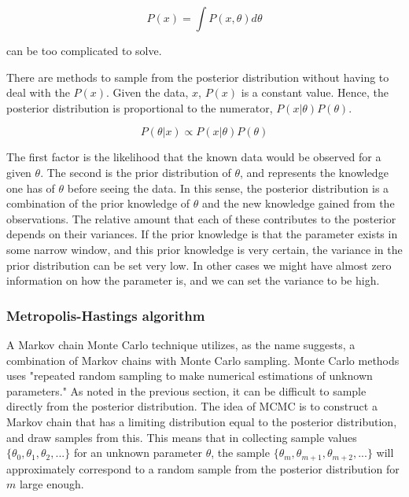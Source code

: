 \begin{equation}
    P(x) = \int P(x,\theta)d\theta
\end{equation}

can be too complicated to solve. 

There are methods to sample from the posterior distribution without having to deal with the $P(x)$. Given the data, $x$, $P(x)$ is a constant value. Hence, the posterior distribution is proportional to the numerator, $P(x|\theta)P(\theta)$. 

\begin{equation}
    P(\theta | x) \propto P(x|\theta)P(\theta)
\end{equation}

 The first factor is the likelihood that the known data would be observed for a given $\theta$. The second is the prior distribution of $\theta$, and represents the knowledge one has of $\theta$ before seeing the data. In this sense, the posterior distribution is a combination of the prior knowledge of $\theta$ and the new knowledge gained from the observations. The relative amount that each of these contributes to the posterior depends on their variances. If the prior knowledge is that the parameter exists in some narrow window, and this prior knowledge is very certain, the variance in the prior distribution can be set very low. In other cases we might have almost zero information on how the parameter is, and we can set the variance to be high. 

\subsubsection{Metropolis-Hastings algorithm}
\label{Metropolis}
A Markov chain Monte Carlo technique utilizes, as the name suggests, a combination of Markov chains with Monte Carlo sampling. Monte Carlo methods uses "repeated random sampling to make numerical estimations of unknown parameters."  
As noted in the previous section, it can be difficult to sample directly from the posterior distribution. The idea of MCMC is to construct a Markov chain that has a limiting distribution equal to the posterior distribution, and draw samples from this. This means that in collecting sample values $\{\theta_0, \theta_1, \theta_2,...\}$ for an unknown parameter $\theta$, the sample $\{\theta_m, \theta_{m+1}, \theta_{m+2},...\}$ will approximately correspond to a random sample from the posterior distribution for $m$ large enough. 

